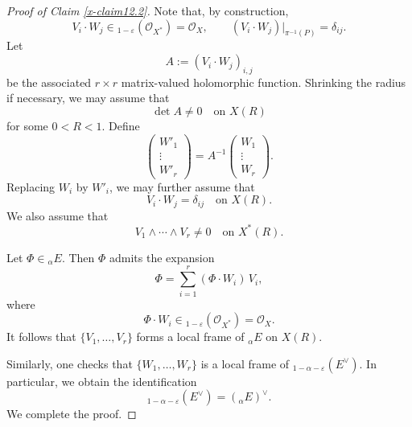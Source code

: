\documentclass[10pt,a4paper]{amsart}
\begin{document}
\begin{proof}[Proof of Claim \ref{x-claim12.2}]
Note that, by construction,
\[
V_i \cdot W_j \in {}_{1-\varepsilon}\left(\mathcal O_{X^*}\right)
= \mathcal O_X,
\qquad
(V_i \cdot W_j)\big|_{\pi^{-1}(P)} = \delta_{ij}.
\]
Let
\[
A := (V_i \cdot W_j)_{i,j}
\]
be the associated $r\times r$ matrix-valued holomorphic function.
Shrinking the radius if necessary, we may assume that
\[
\det A \neq 0 \quad \text{on } X(R)
\]
for some $0<R<1$.
Define
\[
\begin{pmatrix}
W'_1 \\ \vdots \\ W'_r
\end{pmatrix}
=
A^{-1}
\begin{pmatrix}
W_1 \\ \vdots \\ W_r
\end{pmatrix}.
\]
Replacing $W_i$ by $W'_i$, we may further assume that
\[
V_i \cdot W_j = \delta_{ij}
\quad \text{on } X(R).
\]
We also assume that
\[
V_1 \wedge \cdots \wedge V_r \neq 0
\quad \text{on } X^*(R).
\]

Let $\Phi \in {}_\alpha E$.
Then $\Phi$ admits the expansion
\[
\Phi = \sum_{i=1}^r (\Phi \cdot W_i)\, V_i,
\]
where
\[
\Phi \cdot W_i \in {}_{1-\varepsilon}\left(\mathcal O_{X^*}\right)
= \mathcal O_X.
\]
It follows that $\{V_1,\ldots,V_r\}$ forms a local frame of
${}_\alpha E$ on $X(R)$.

Similarly, one checks that $\{W_1,\ldots,W_r\}$ is a local frame of
${}_{1-\alpha-\varepsilon}(E^\vee)$.
In particular, we obtain the identification
\[
{}_{1-\alpha-\varepsilon}(E^\vee) = ({}_\alpha E)^\vee.
\] 
We complete the proof. 
\end{proof}
\end{document}
